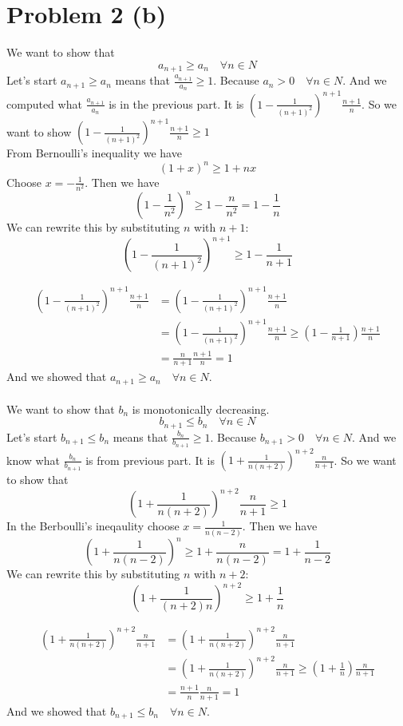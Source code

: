 \documentclass{article}
\begin{document}
\section*{Problem 2 (b)}
We want to show that
\[
   a_{n+1} \geq a_n \quad \forall n \in N
\]
Let's start
\(a_{n+1} \geq a_n\) means that \(\frac{a_{n+1}}{a_n} \geq 1\). Because \(a_n > 0 \quad \forall n \in N\).
And we computed what \(\frac{a_{n+1}}{a_n}\) is in the previous part. It is \(\left(1 - \frac{1}{(n+1)^2} \right)^{n+1} \frac{n+1}{n}\).
So we want to show \(\left(1 - \frac{1}{(n+1)^2} \right)^{n+1} \frac{n+1}{n} \geq 1\) \\
From Bernoulli's inequality we have
\[
   (1 + x)^n \geq 1 + nx
\]
Choose \(x = - \frac{1}{n^2}\). Then we have
\[
   \left(1 - \frac{1}{n^2} \right)^{n} \geq 1 - \frac{n}{n^2} = 1 - \frac{1}{n}
\]
We can rewrite this by substituting \(n\) with \(n+1\):
\[
   \left(1 - \frac{1}{(n+1)^2} \right)^{n+1} \geq 1 - \frac{1}{n+1}
\]

\begin{align*}
   \left(1 - \frac{1}{(n+1)^2} \right)^{n+1} \frac{n+1}{n} &= \left(1 - \frac{1}{(n+1)^2} \right)^{n+1} \frac{n+1}{n} \\
      &=  \left(1 - \frac{1}{(n+1)^2} \right)^{n+1} \frac{n+1}{n} \geq (1 - \frac{1}{n+1}) \frac{n+1}{n} \\
      &= \frac{n}{n+1} \frac{n+1}{n} = 1
\end{align*}
And we showed that \(a_{n+1} \geq a_n \quad \forall n \in N\).\\
\\
We want to show that \(b_n\) is monotonically decreasing.
\[
   b_{n+1} \leq b_n \quad \forall n \in N
\]
Let's start
\(b_{n+1} \leq b_n\) means that \(\frac{b_n}{b_{n+1}} \geq 1\). Because \(b_{n+1} > 0 \quad \forall n \in N\).
And we know what \(\frac{b_n}{b_{n+1}}\) is from previous part. It is \(\left(1 + \frac{1}{n(n+2)} \right)^{n+2} \frac{n}{n+1}\).
So we want to show that
\[
   \left(1 + \frac{1}{n(n+2)} \right)^{n+2} \frac{n}{n+1} \geq 1
\]
In the Berboulli's ineqaulity choose \(x = \frac{1}{n(n-2)}\). Then we have
\[
   \left(1 + \frac{1}{n(n-2)} \right)^{n} \geq 1 + \frac{n}{n(n-2)} = 1 + \frac{1}{n-2}
\]
We can rewrite this by substituting \(n\) with \(n+2\):
\[
   \left(1 + \frac{1}{(n+2)n} \right)^{n+2} \geq 1 + \frac{1}{n}
\]

\begin{align*}
   \left(1 + \frac{1}{n(n+2)} \right)^{n+2} \frac{n}{n+1} &= \left(1 + \frac{1}{n(n+2)} \right)^{n+2} \frac{n}{n+1} \\
      &=  \left(1 + \frac{1}{n(n+2)} \right)^{n+2} \frac{n}{n+1} \geq (1 + \frac{1}{n}) \frac{n}{n+1} \\
      &= \frac{n+1}{n} \frac{n}{n+1} = 1
\end{align*}
And we showed that \(b_{n+1} \leq b_n \quad \forall n \in N\).
\end{document}
